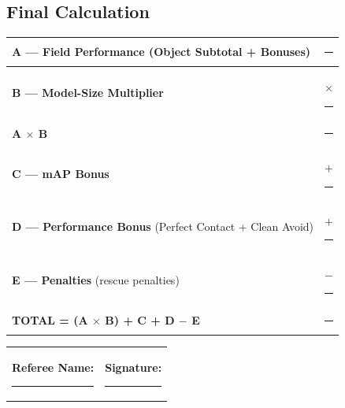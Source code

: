 \documentclass[a4]{article}
\begin{document}
\subsection*{Final Calculation}

\begin{table}[H]
\centering
\begin{tabular}{|l|r|}
\hline
\textbf{A --- Field Performance} (Object Subtotal + Bonuses) & \rule{3cm}{0.4pt} \\
\hline
\textbf{B --- Model-Size Multiplier} & $\times$ \rule{2cm}{0.4pt} \\
\hline
\textbf{A $\times$ B} & \rule{3cm}{0.4pt} \\
\hline
\textbf{C --- mAP Bonus} & $+$ \rule{2cm}{0.4pt} \\
\hline
\textbf{D --- Performance Bonus} (Perfect Contact + Clean Avoid) & $+$ \rule{2cm}{0.4pt} \\
\hline
\textbf{E --- Penalties} (rescue penalties) & $-$ \rule{2cm}{0.4pt} \\
\hline
\textbf{TOTAL = (A $\times$ B) + C + D $-$ E} & \rule{3cm}{0.4pt} \\
\hline
\end{tabular}
\end{table}

\vspace{1em}

\begin{tabular}{p{6cm}p{6cm}}
\textbf{Referee Name:} \rule{5cm}{0.4pt} & \textbf{Signature:} \rule{5cm}{0.4pt} \\
\end{tabular}
\end{document}
